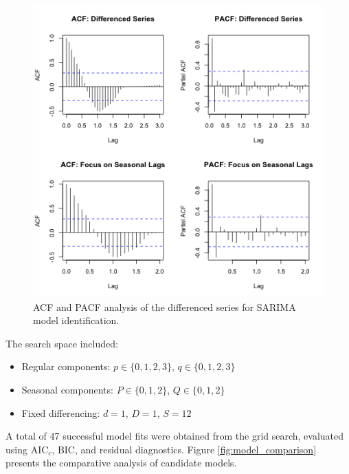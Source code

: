 \documentclass[journal]{IEEEtran}
\begin{document}
\begin{figure}[h]
    \centering
    \includegraphics[width=1\linewidth]{plots/model-identification.png}
    \caption{ACF and PACF analysis of the differenced series for SARIMA model identification.}
    \label{fig:identification}
\end{figure}

The search space included:
\begin{itemize}
    \item Regular components: $p \in \{0,1,2,3\}$, $q \in \{0,1,2,3\}$
    \item Seasonal components: $P \in \{0,1,2\}$, $Q \in \{0,1,2\}$
    \item Fixed differencing: $d=1$, $D=1$, $S=12$
\end{itemize}

A total of 47 successful model fits were obtained from the grid search, evaluated using AIC$_c$, BIC, and residual diagnostics. Figure \ref{fig:model_comparison} presents the comparative analysis of candidate models.
\end{document}
